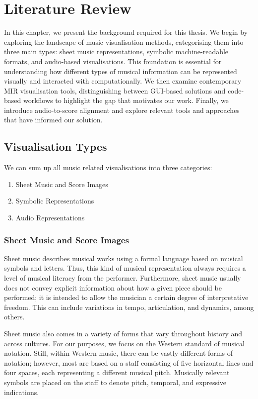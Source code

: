 \chapter{Literature Review} \label{chap:sota}
In this chapter, we present the background required for this thesis. We begin by exploring the landscape of music visualisation methods, categorising them into three main types: sheet music representations, symbolic machine-readable formats, and audio-based visualisations. This foundation is essential for understanding how different types of musical information can be represented visually and interacted with computationally. We then examine contemporary MIR visualisation tools, distinguishing between GUI-based solutions and code-based workflows to highlight the gap that motivates our work. Finally, we introduce audio-to-score alignment and explore relevant tools and approaches that have informed our solution.

\section{Visualisation Types}
We can sum up all music related visualisations into three categories:
\begin{enumerate}
    \item Sheet Music and Score Images
    \item Symbolic Representations
    \item Audio Representations
\end{enumerate}

\subsection{Sheet Music and Score Images}

Sheet music describes musical works using a formal language based on musical symbols and letters. Thus, this kind of musical representation always requires a level of musical literacy from the performer. Furthermore, sheet music usually does not convey explicit information about how a given piece should be performed; it is intended to allow the musician a certain degree of interpretative freedom. This can include variations in tempo, articulation, and dynamics, among others.

Sheet music also comes in a variety of forms that vary throughout history and across cultures. For our purposes, we focus on the Western standard of musical notation. Still, within Western music, there can be vastly different forms of notation; however, most are based on a staff consisting of five horizontal lines and four spaces, each representing a different musical pitch. Musically relevant symbols are placed on the staff to denote pitch, temporal, and expressive indications. \cite{mullerFundamentalsMusicProcessing2015}

